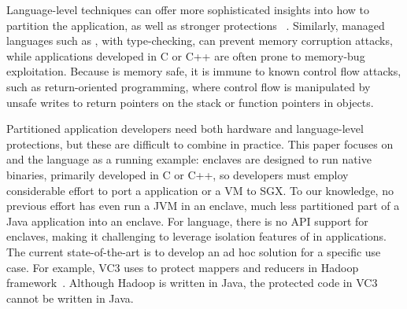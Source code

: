 Language-level techniques can offer more sophisticated insights into how
to partition the application, as well as stronger protections ~\citep{bittau2008wedge,brumley2004privtrans,khatiwala2006data}.
Similarly, managed languages such as \java{}, with type-checking,
can prevent memory corruption attacks,
while applications developed in C or C++ are often prone to memory-bug exploitation.  
Because \java{} is memory safe, it is immune to known control flow attacks, such as return-oriented programming,
where control flow is manipulated by unsafe writes to return pointers on the stack or function pointers in objects.


Partitioned application developers need both hardware and language-level protections,
but these are difficult to combine in practice.
This paper focuses on \sgx{} and the \java{} language as a running example:
\sgx{} enclaves are designed to run native binaries, primarily developed in C or C++,
so developers must employ considerable effort to port a \java{} application or a \java{} VM to SGX.
To our knowledge, no previous effort has even run a JVM in an enclave, much less partitioned part of a Java application into an enclave.
For \java{} language, there is no API support for \sgx{} enclaves,
making it challenging to leverage isolation features of \sgx{}
in \java{} applications. 
The current  state-of-the-art is to develop an ad hoc solution for 
a specific use case.
For example, VC3 uses \sgx{} to protect mappers and reducers in Hadoop framework~\citep{vc3}.
Although Hadoop is written in Java, the protected code in VC3 cannot be written in Java.

